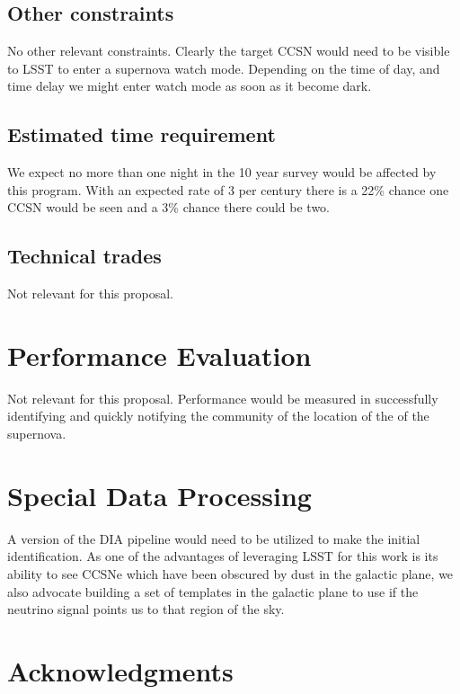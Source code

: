 \documentclass[12pt, letterpaper]{article}
\begin{document}
\subsection{Other constraints}

No other relevant constraints.  Clearly the target CCSN would need to be
visible to LSST to enter a supernova watch mode.  Depending on the
time of day, and time delay we might enter watch mode as soon as it
become dark.

\subsection{Estimated time requirement}

We expect no more than one night in the 10 year survey would be
affected by this program. With an expected rate of 3 per century there
is a 22\% chance one CCSN would be seen and a 3\% chance there could
be two.

\subsection{Technical trades}

Not relevant for this proposal.

\section{Performance Evaluation}

Not relevant for this proposal.  Performance would be measured in successfully
identifying and quickly notifying the community of the location of the
of the supernova.

\section{Special Data Processing}

A version of the DIA pipeline would need to be utilized to make the
initial identification.  As one of the advantages of leveraging LSST
for this work is its ability to see CCSNe which have been obscured by
dust in the galactic plane, we also advocate building a set of
templates in the galactic plane to use if the neutrino signal points
us to that region of the sky.

\section{Acknowledgments}
\end{document}

